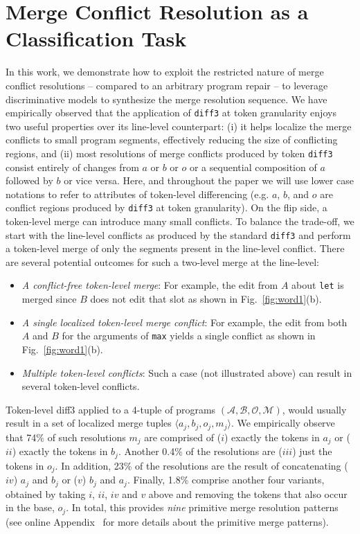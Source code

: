 

\section{Merge Conflict Resolution as a Classification Task}
\label{formulation}

In this work, we demonstrate how to exploit the restricted nature of merge conflict resolutions -- compared to an arbitrary program repair -- to leverage discriminative models to synthesize the merge resolution sequence.
We have empirically observed that the application of \texttt{diff3} at token granularity enjoys two useful properties over its line-level counterpart: (i) it helps localize the merge conflicts to small program segments, effectively reducing the size of conflicting regions, and (ii) most resolutions of merge conflicts produced by token \texttt{diff3} consist entirely of changes from $a$ or $b$ or $o$ or a sequential composition of $a$ followed by $b$ or vice versa. Here, and throughout the paper we will use lower case notations to refer to attributes of token-level differencing (e.g. $a$, $b$, and $o$ are conflict regions produced by \texttt{diff3} at token granularity).
On the flip side, a token-level merge can introduce many small conflicts. 
To balance the trade-off, we start with the line-level conflicts as produced by the standard \texttt{diff3} and perform a token-level merge of only the segments present in the line-level conflict.
There are several potential outcomes for such a two-level merge at the line-level: 
\begin{itemize}
\item {\it A conflict-free token-level merge}: For example, the edit from $A$ about \texttt{let} is merged since $B$ does not edit that slot as shown in Fig.~\ref{fig:word1}(b).  
\item {\it A single localized token-level merge conflict}: For example, the edit from both $A$ and $B$ for the arguments of \texttt{max} yields a single conflict as shown in Fig.~\ref{fig:word1}(b).
\item {\it Multiple token-level conflicts}: Such a case (not illustrated above) can result in several token-level conflicts. %
\end{itemize}

Token-level diff3 applied to a 4-tuple of programs $(\mathcal{A}, \mathcal{B}, \mathcal{O}, \mathcal{M})$, would usually result in a set of localized merge tuples $\langle a_j, b_j, o_j, m_j\rangle$. 
We empirically observe that 74\% of such resolutions $m_j$ are comprised of ($i$) exactly the tokens in $a_j$ or ($ii$) exactly the tokens in $b_j$.  Another 0.4\% of the resolutions are ($iii$) just the tokens in $o_j$. In addition, 23\% of the resolutions are the result of concatenating ($iv$) $a_j$ and $b_j$ or ($v$) $b_j$ and $a_j$.  Finally, 1.8\% comprise another four variants, obtained by taking $i$, $ii$, $iv$ and $v$ above and removing the tokens that also occur in the base, $o_j$. In total, this provides \textit{nine} primitive merge resolution patterns (see online Appendix~\cite{FSE22Appendix} for more details about the primitive merge patterns). 

